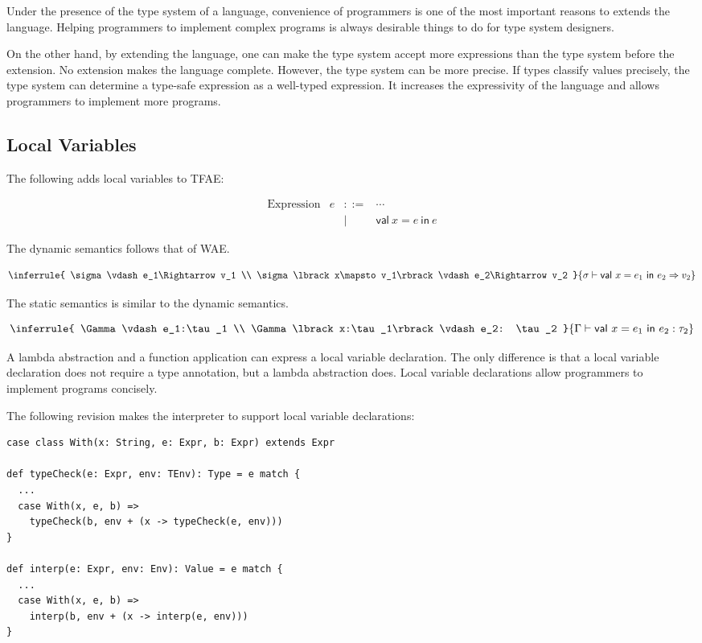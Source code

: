 Under the presence of the type system of a language, convenience of programmers
is one of the most important reasons to extends the language. Helping programmers
to implement complex programs is always desirable things to do for type system
designers.

On the other hand, by extending the language, one can make the type system accept
more expressions than the type system before the extension. No extension makes
the language complete. However, the type system can be more precise. If types
classify values precisely, the type system can determine a type-safe expression
as a well-typed expression. It increases the expressivity of the language and
allows programmers to implement more programs.

\subsection{Local Variables}

The following adds local variables to TFAE:

\[
\begin{array}{lrcl}
\text{Expression} & e & ::= & \cdots \\
&& | & \textsf{val}\ x=e\ \textsf{in}\ e
\end{array}
\]

The dynamic semantics follows that of WAE.

\[
\inferrule
{
  \sigma\vdash e_1\Rightarrow v_1 \\
  \sigma\lbrack x\mapsto v_1\rbrack\vdash e_2\Rightarrow v_2
}
{ \sigma\vdash \textsf{val}\ x=e_1\ \textsf{in}\ e_2\Rightarrow v_2 }
\]

The static semantics is similar to the dynamic semantics.

\[
\inferrule
{
  \Gamma\vdash e_1:\tau_1 \\
  \Gamma\lbrack x:\tau_1\rbrack\vdash e_2: \tau_2
}
{ \Gamma\vdash \textsf{val}\ x=e_1\ \textsf{in}\ e_2:\tau_2 }
\]

A lambda abstraction and a function application can express a local variable
declaration. The only difference is that a local variable declaration does not
require a type annotation, but a lambda abstraction does. Local variable
declarations allow programmers to implement programs concisely.

The following revision makes the interpreter to support local variable
declarations:

\begin{verbatim}
case class With(x: String, e: Expr, b: Expr) extends Expr

def typeCheck(e: Expr, env: TEnv): Type = e match {
  ...
  case With(x, e, b) =>
    typeCheck(b, env + (x -> typeCheck(e, env)))
}

def interp(e: Expr, env: Env): Value = e match {
  ...
  case With(x, e, b) =>
    interp(b, env + (x -> interp(e, env)))
}
\end{verbatim}

